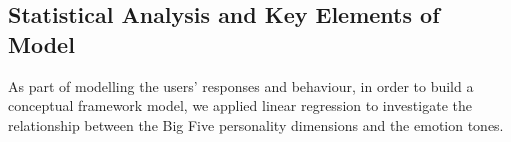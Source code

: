 \documentclass[graybox]{svmult}
\begin{document}
{%

\subsection{Statistical Analysis and Key Elements of Model}

As part of modelling the users' responses and behaviour, in order to build a conceptual framework model, we applied linear
regression to investigate the relationship between the Big Five
personality dimensions and the emotion tones.


}
\end{document}
